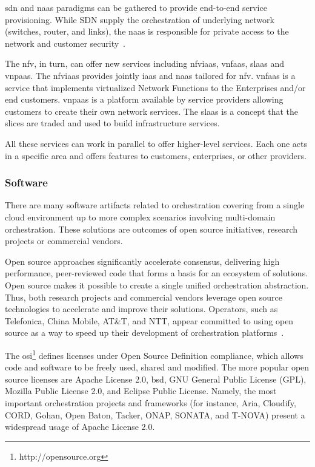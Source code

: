 \gls{sdn} and \gls{naas} paradigms can be gathered to provide end-to-end service provisioning. While SDN supply the orchestration of underlying network (switches, router, and links), the \gls{naas} is responsible for private access to the network and customer security~\cite{Karakus2017QualitySurvey}. 

The \gls{nfv}, in turn, can offer new services including \gls{nfviaas}, \gls{vnfaas}, \gls{slaas} and \gls{vnpaas}. The \gls{nfviaas} provides jointly \gls{iaas} and \gls{naas} tailored for \gls{nfv}. \gls{vnfaas} is a service that implements virtualized Network Functions to the Enterprises and/or end customers. \gls{vnpaas} is a platform available by service providers allowing customers to create their own network services. The \gls{slaas} is a concept that the slices are traded and used to build infrastructure services.

All these services can work in parallel to offer higher-level services. Each one acts in a specific area and offers features to customers, enterprises, or other providers.   

\subsubsection{Software} 
There are many software artifacts related to orchestration covering from a single cloud environment up to more complex scenarios involving multi-domain orchestration. These solutions are outcomes of open source initiatives, research projects or commercial vendors.   

Open source approaches significantly accelerate consensus, delivering high performance, peer-reviewed code that forms a basis for an ecosystem of solutions. Open source makes it possible to create a single unified orchestration abstraction.  Thus, both research projects and commercial vendors leverage open source technologies to accelerate and improve their solutions. Operators, such as Telefonica, China Mobile, AT\&T, and NTT, appear committed to using open source as a way to speed up their development of orchestration platforms~\cite{Sdxcentral20162016:}.

The \gls{osi}\footnote{http://opensource.org} defines licenses under Open Source Definition compliance, which allows code and software to be freely used, shared and modified. The more popular open source licenses are Apache License 2.0, \gls{bsd}, GNU General Public License (GPL), Mozilla Public License 2.0, and Eclipse Public License. Namely, the most important orchestration projects and frameworks (for instance, Aria, Cloudify, CORD, Gohan, Open Baton, Tacker, ONAP, SONATA, and T-NOVA) present a widespread usage of Apache License 2.0.

